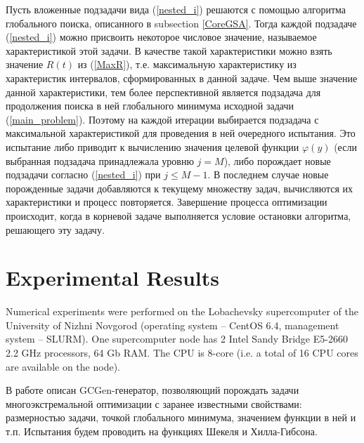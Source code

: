 \documentclass[entropy,article,submit,moreauthors,pdftex]{Definitions/mdpi}
\begin{document}
Пусть вложенные подзадачи вида (\ref{nested_i}) решаются с помощью алгоритма глобального поиска, описанного в subsection \ref{CoreGSA}. Тогда каждой подзадаче (\ref{nested_i}) можно присвоить некоторое числовое значение, называемое характеристикой этой задачи. В качестве такой характеристики можно взять значение $R(t)$ из (\ref{MaxR}), т.е. максимальную характеристику из характеристик интервалов, сформированных в данной задаче. Чем выше значение данной характеристики, тем более перспективной является подзадача для продолжения поиска в ней глобального минимума исходной задачи (\ref{main_problem}). Поэтому на каждой итерации выбирается подзадача с максимальной характеристикой для проведения в ней очередного испытания. Это испытание либо приводит к вычислению значения целевой функции $\varphi(y)$ (если выбранная подзадача принадлежала уровню $j=M$), либо порождает новые подзадачи согласно (\ref{nested_i}) при $j\leq M-1$. В последнем случае новые порожденные задачи добавляются к текущему множеству задач, вычисляются их характеристики и процесс повторяется. Завершение процесса оптимизации происходит, когда в корневой задаче выполняется условие остановки алгоритма, решающего эту задачу.



\section{Experimental Results}

Numerical experiments were performed on the Lobachevsky supercomputer of the University of Nizhni Novgorod (operating system -- CentOS 6.4, management system -- SLURM). One supercomputer node has 2 Intel Sandy Bridge E5-2660 2.2 GHz processors, 64 Gb RAM. The CPU is 8-core (i.e. a total of 16 CPU cores are available on the node).

В работе \cite{Gergel2019} описан GCGen-генератор, позволяющий порождать задачи многоэкстремальной оптимизации с заранее известными свойствами: размерностью задачи, точкой глобального минимума, значением функции в ней и т.п.
Испытания будем проводить на функциях Шекеля и Хилла-Гибсона. 
\end{document}
